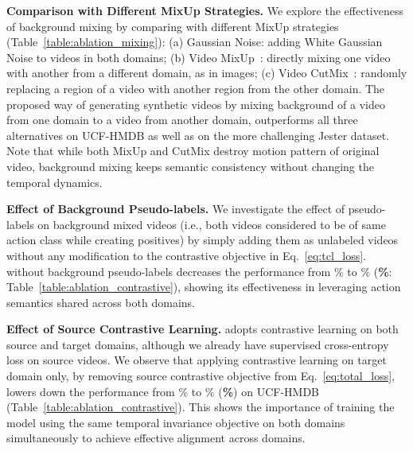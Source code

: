 \textbf{Comparison with Different MixUp Strategies.} We explore the effectiveness of background mixing by comparing with different MixUp strategies (Table~\ref{table:ablation_mixing}): (a) Gaussian Noise: adding White Gaussian Noise to videos in both domains; (b) Video MixUp~\cite{zhang2017mixup}: directly mixing one video with another from a different domain, as in images; (c) Video CutMix~\cite{yun2019cutmix}: randomly replacing a region of a video with another region from the other domain.
The proposed way of generating synthetic videos by mixing background of a video from one domain to a video from another domain, outperforms all three alternatives on UCF-HMDB as well as on the more challenging Jester dataset. Note that while both MixUp and CutMix destroy motion pattern of original video, background mixing keeps semantic consistency without changing the temporal dynamics. 


\textbf{Effect of Background Pseudo-labels.} We investigate the effect of pseudo-labels on background mixed videos (i.e., both videos considered to be of same action class while creating positives) by simply adding them as unlabeled videos without any modification to the contrastive objective in Eq.~\ref{eq:tcl_loss}. \ours without background pseudo-labels decreases the performance from \% to \% (\textbf{\%}: Table~\ref{table:ablation_contrastive}), showing its effectiveness in leveraging action semantics shared across both domains. 

\textbf{Effect of Source Contrastive Learning.} \ours adopts contrastive learning on both source and target domains, although we already have supervised cross-entropy loss on source videos. We observe that applying contrastive learning on target domain only, by removing source contrastive objective  from Eq.~\ref{eq:total_loss}, lowers down the performance from \% to \% (\textbf{\%}) on UCF-HMDB (Table~\ref{table:ablation_contrastive}). This shows the importance of training the model using the same temporal invariance objective on both domains simultaneously to achieve effective alignment across domains.

